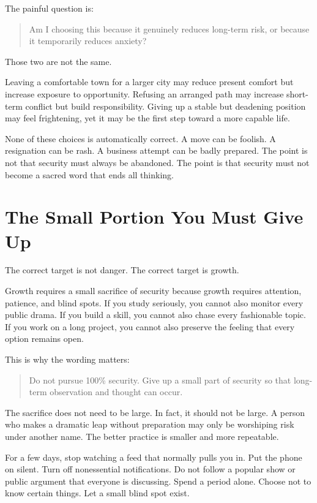 The painful question is:

\begin{quote}
Am I choosing this because it genuinely reduces long-term risk, or because it temporarily reduces anxiety?
\end{quote}

Those two are not the same.

Leaving a comfortable town for a larger city may reduce present comfort but increase exposure to opportunity. Refusing an arranged path may increase short-term conflict but build responsibility. Giving up a stable but deadening position may feel frightening, yet it may be the first step toward a more capable life.

None of these choices is automatically correct. A move can be foolish. A resignation can be rash. A business attempt can be badly prepared. The point is not that security must always be abandoned. The point is that security must not become a sacred word that ends all thinking.

\section*{The Small Portion You Must Give Up}

The correct target is not danger. The correct target is growth.

Growth requires a small sacrifice of security because growth requires attention, patience, and blind spots. If you study seriously, you cannot also monitor every public drama. If you build a skill, you cannot also chase every fashionable topic. If you work on a long project, you cannot also preserve the feeling that every option remains open.

This is why the wording matters:

\begin{quote}
Do not pursue 100\% security. Give up a small part of security so that long-term observation and thought can occur.
\end{quote}

The sacrifice does not need to be large. In fact, it should not be large. A person who makes a dramatic leap without preparation may only be worshiping risk under another name. The better practice is smaller and more repeatable.

For a few days, stop watching a feed that normally pulls you in. Put the phone on silent. Turn off nonessential notifications. Do not follow a popular show or public argument that everyone is discussing. Spend a period alone. Choose not to know certain things. Let a small blind spot exist.

